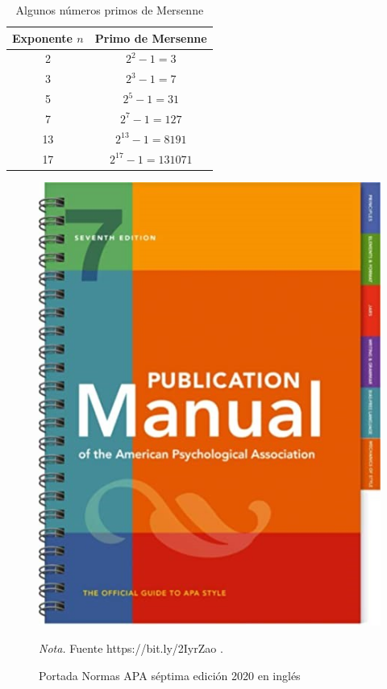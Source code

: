 \clearpage

\begin{table}%
\caption{Algunos números primos de Mersenne}
\begin{center}
\begin{tabular}{ c|c}
    \hline
    Exponente $n$ & Primo de Mersenne \\ \hline
    2 &  $2^{2}-1=3 $ \\ \hline
    3 &  $2^{3}-1=7 $ \\ \hline
    5 &  $2^{5}-1=31 $ \\ \hline
    7 &  $2^{7}-1=127 $ \\ \hline
    13 &  $2^{13}-1=8191 $ \\ \hline
    17 &  $2^{17}-1=131071 $ \\
        \hline
\end{tabular}
\end{center}
\label{table:num_mersenne}
\end{table}


\begin{figure}[!ht]
\caption{Portada Normas APA séptima edición 2020 en inglés}
    \begin{center}
    \includegraphics[scale=0.4]{imagenes/portadaAPA2020.jpg}\\
    \label{figportada_apa}
    \end{center}
    \textit{Nota.} Fuente https://bit.ly/2IyrZao \citep{lib:apa}.
\end{figure}

